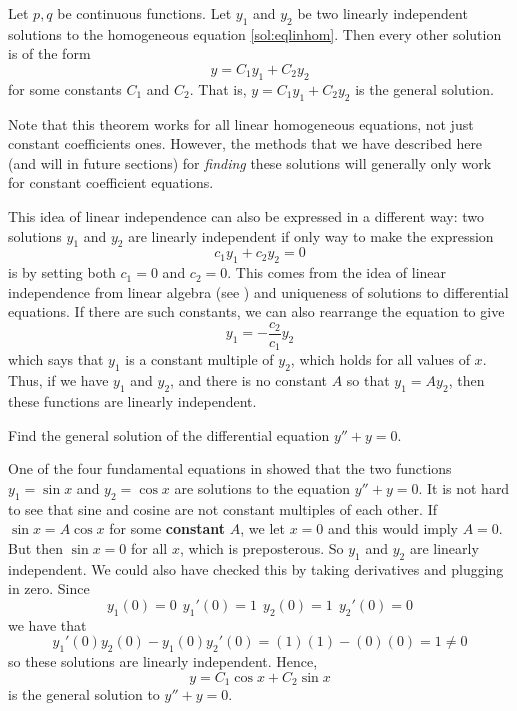 \documentclass{ximera}
\begin{document}
\begin{theorem}{}
    Let $p, q$ be continuous functions. Let $y_1$ and $y_2$ be two linearly independent solutions to the homogeneous equation \eqref{sol:eqlinhom}. Then every other solution is of the form
    \begin{equation*}
        y = C_1 y_1 + C_2 y_2
    \end{equation*} for some constants $C_1$ and $C_2$. That is, $y = C_1 y_1 + C_2 y_2$ is the general solution.
\end{theorem}

Note that this theorem works for all linear homogeneous equations, not just constant coefficients ones. However, the methods that we have described here (and will in future sections) for \emph{finding} these solutions will generally only work for constant coefficient equations.

This idea of linear independence can also be expressed in a different way: two solutions $y_1$ and $y_2$ are linearly independent if only way to make the expression \[c_1 y_1 + c_2 y_2 = 0 \] is by setting both $c_1 = 0$ and $c_2 = 0$. This comes from the idea of linear independence from linear algebra (see ) and uniqueness of solutions to differential equations. If there are such constants, we can also rearrange the equation to give
\[ 
    y_1 = -\frac{c_2}{c_1}y_2 
\]
which says that $y_1$ is a constant multiple of $y_2$, which holds for all values of $x$. Thus, if we have $y_1$ and $y_2$, and there is no constant $A$ so that $y_1 = Ay_2$, then these functions are linearly independent. 

\begin{example}
    Find the general solution of the differential equation $y'' + y = 0$.
\end{example}

\begin{exampleSol}
    One of the four fundamental equations in  showed that the two functions $y_1 = \sin x$ and $y_2 = \cos x$ are solutions to the equation $y'' + y = 0$.  It is not hard to see that sine and cosine are not constant multiples of each other.  If $\sin x = A \cos x$ for some \textbf{constant} $A$, we let $x=0$ and this would imply $A = 0$.  But then $\sin x = 0$ for all $x$, which is preposterous. So $y_1$ and $y_2$ are linearly independent.  We could also have checked this by taking derivatives and plugging in zero. Since 
    \begin{equation*}
        y_1(0) = 0 \ \ y_1'(0) = 1\ \ y_2(0) = 1\ \ y_2'(0) = 0 
    \end{equation*}
    we have that
    \begin{equation*}
        y_1'(0)y_2(0) - y_1(0)y_2'(0) = (1)(1) - (0)(0) = 1 \neq 0
    \end{equation*}
    so these solutions are linearly independent. Hence,
    \begin{equation*}
        y = C_1 \cos x + C_2 \sin x 
    \end{equation*}
    is the general solution to $y'' + y = 0$.
\end{exampleSol}
\end{document}
